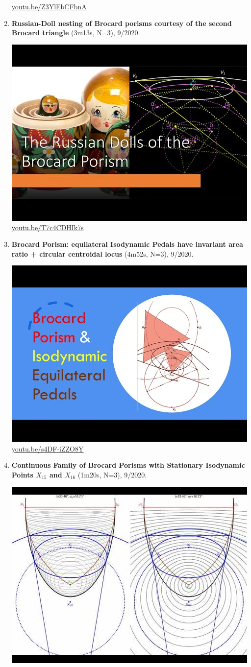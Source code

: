 \documentclass[12pt]{amsart}
\begin{document}
\begin{enumerate}[resume]
\begin{center}
\href{https://youtu.be/Z3YlEbCFbnA}{\url{youtu.be/Z3YlEbCFbnA}}\end{center}
% 
\item \textbf{Russian-Doll nesting of Brocard porisms courtesy of the second Brocard triangle} (3m13s, N=3), 9/2020. 
\begin{center}\includegraphics[width=.5\textwidth]{pics/T7c4CDHIk7s.jpg} \\ 
\href{https://youtu.be/T7c4CDHIk7s}{\url{youtu.be/T7c4CDHIk7s}}\end{center}
% 
\item \textbf{Brocard Porism: equilateral Isodynamic Pedals have invariant area ratio + circular centroidal locus} (4m52s, N=3), 9/2020. 
\begin{center}\includegraphics[width=.5\textwidth]{pics/s4DF-iZZO8Y.jpg} \\ 
\href{https://youtu.be/s4DF-iZZO8Y}{\url{youtu.be/s4DF-iZZO8Y}}\end{center}
% 
\item \textbf{Continuous Family of Brocard Porisms with Stationary Isodynamic Points $X_{15}$ and $X_{16}$} (1m20s, N=3), 9/2020. 
\begin{center}\includegraphics[width=.5\textwidth]{pics/jY_8zxBljuk.jpg} \\ 

\end{center}
\end{enumerate}
\end{document}
